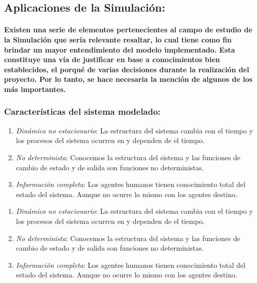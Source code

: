 \documentclass[12pt]{amsart}
\begin{document}
\subsection{Aplicaciones de la Simulación:}

\paragraph{Existen una serie de elementos pertenecientes al campo de estudio de la Simulación que sería relevante resaltar, lo cual tiene como fin brindar un mayor entendimiento del modelo implementado. Esta constituye una vía de justificar en base a conocimientos bien establecidos, el porqué de varias decisiones durante la realización del proyecto. Por lo tanto, se hace necesaria la mención de algunos de los más importantes.}

\subsubsection{Características del sistema modelado:}

\begin {enumerate}
				\item {\textit{Dinámico no estacionario}: La estructura del sistema cambia con el tiempo y los procesos del sistema ocurren en y dependen de el tiempo.}
				\item {\textit{No determinista}: Conocemos la estructura del sistema y las funciones de cambio de estado y de salida son funciones no deterministas.}
				\item {\textit{Información completa}: Los agentes humanos tienen conocimiento total del estado del sistema. Aunque no ocurre lo mismo con los agentes destino.}
				
\end {enumerate}

\begin {enumerate}
				\item {\textit{Dinámico no estacionario}: La estructura del sistema cambia con el tiempo y los procesos del sistema ocurren en y dependen de el tiempo.}
				\item {\textit{No determinista}: Conocemos la estructura del sistema y las funciones de cambio de estado y de salida son funciones no deterministas.}
				\item {\textit{Información completa}: Los agentes humanos tienen conocimiento total del estado del sistema. Aunque no ocurre lo mismo con los agentes destino.}
				
\end {enumerate}
\end{document}
